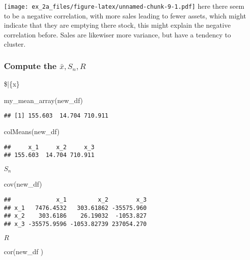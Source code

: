\documentclass[
]{article}
\newenvironment{Shaded}{\begin{snugshade}}{\end{snugshade}}
\newcommand{\FunctionTok}[1]{\textcolor[rgb]{0.00,0.00,0.00}{#1}}
\newcommand{\NormalTok}[1]{#1}
\begin{document}
\texttt{[image: ex\_2a\_files/figure-latex/unnamed-chunk-9-1.pdf]} here
there seem to be a negative correlation, with more sales leading to
fewer assets, which might indicate that they are emptying there stock,
this might explain the negative correlation before. Sales are likewiser
more variance, but have a tendency to cluster.

\hypertarget{compute-the-barx-s_n-r}{%
\subsubsection{\texorpdfstring{Compute the
\textbf{\(\bar{x}, S_n, R\)}}{Compute the \textbackslash bar\{x\}, S\_n, R}}\label{compute-the-barx-s_n-r}}

\$\bar\{x\}

\begin{Shaded}
\begin{Highlighting}[]
\FunctionTok{my\_mean\_array}\NormalTok{(new\_df)}
\end{Highlighting}
\end{Shaded}

\begin{verbatim}
## [1] 155.603  14.704 710.911
\end{verbatim}

\begin{Shaded}
\begin{Highlighting}[]
\FunctionTok{colMeans}\NormalTok{(new\_df)}
\end{Highlighting}
\end{Shaded}

\begin{verbatim}
##     x_1     x_2     x_3 
## 155.603  14.704 710.911
\end{verbatim}

\(S_n\)

\begin{Shaded}
\begin{Highlighting}[]
\FunctionTok{cov}\NormalTok{(new\_df)}
\end{Highlighting}
\end{Shaded}

\begin{verbatim}
##             x_1         x_2        x_3
## x_1   7476.4532   303.61862 -35575.960
## x_2    303.6186    26.19032  -1053.827
## x_3 -35575.9596 -1053.82739 237054.270
\end{verbatim}

\(R\)

\begin{Shaded}
\begin{Highlighting}[]
\FunctionTok{cor}\NormalTok{(new\_df}
\NormalTok{    )}
\end{Highlighting}
\end{Shaded}
\end{document}
